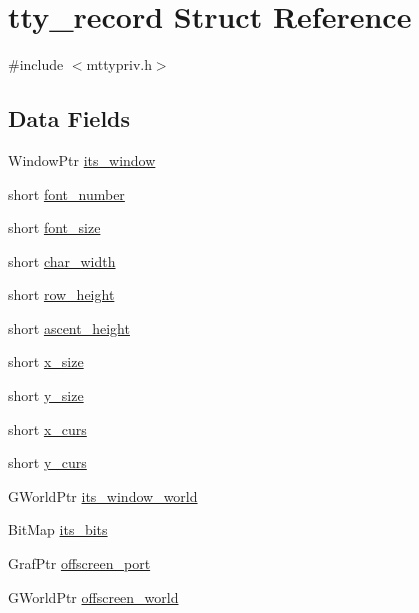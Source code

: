 \hypertarget{structtty__record}{\section{tty\+\_\+record Struct Reference}
\label{structtty__record}
}


{\ttfamily \#include $<$mttypriv.\+h$>$}

\subsection*{Data Fields}
\begin{DoxyCompactItemize}
\item 
Window\+Ptr \hyperlink{structtty__record_a96fac4cadd626dc4cfd9e0d3f64709a8}{its\+\_\+window}
\item 
short \hyperlink{structtty__record_a4ff99f974e680a360f9b2d8ac95947a4}{font\+\_\+number}
\item 
short \hyperlink{structtty__record_a715bf280d2dbfe8b29a0c18271e13410}{font\+\_\+size}
\item 
short \hyperlink{structtty__record_a2c85d65343bb145a61dd70945019e42b}{char\+\_\+width}
\item 
short \hyperlink{structtty__record_ac0d2808f8a463594770388a1a61d92fc}{row\+\_\+height}
\item 
short \hyperlink{structtty__record_a079690b95f37c6e5622ec6a8ad94f494}{ascent\+\_\+height}
\item 
short \hyperlink{structtty__record_a39cb4eed8f87f26b1ab56d6d65d051e2}{x\+\_\+size}
\item 
short \hyperlink{structtty__record_aa44dcd9633186917f63209752768be6d}{y\+\_\+size}
\item 
short \hyperlink{structtty__record_a71665a1dfb9be5900cc5849c78025794}{x\+\_\+curs}
\item 
short \hyperlink{structtty__record_a76f07e1747d0f844f3a1f428b4677032}{y\+\_\+curs}
\item 
G\+World\+Ptr \hyperlink{structtty__record_ad4b8e1a3473cbb12a1a5546d5cd5c56d}{its\+\_\+window\+\_\+world}
\item 
Bit\+Map \hyperlink{structtty__record_a31376f33821be3f31ed01040d5888a72}{its\+\_\+bits}
\item 
Graf\+Ptr \hyperlink{structtty__record_ac93a01eec2960fa101e62517d59d0837}{offscreen\+\_\+port}
\item 
G\+World\+Ptr \hyperlink{structtty__record_ad125bdc62544af4f31425739ab2930dc}{offscreen\+\_\+world}
\item 

\end{DoxyCompactItemize}
